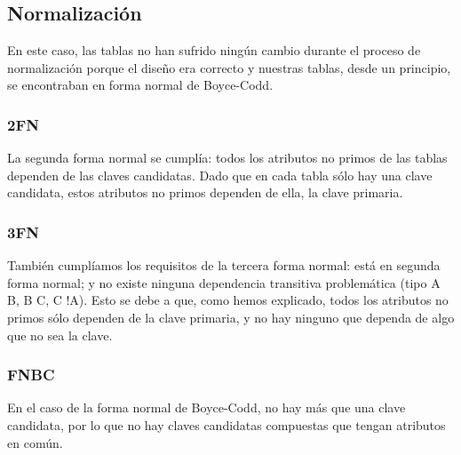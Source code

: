 \subsection{Normalización}
En este caso, las tablas no han sufrido ningún cambio durante el proceso de normalización
porque el diseño era correcto y nuestras tablas, desde un principio, se encontraban en
forma normal de Boyce-Codd.

\subsubsection{2FN}
La segunda forma normal se cumplía: todos los atributos no primos de las tablas dependen de las claves candidatas.
Dado que en cada tabla sólo hay una clave candidata, estos atributos no primos dependen de ella, la clave primaria.


\subsubsection{3FN}
También cumplíamos los requisitos de la tercera forma normal: está en segunda forma normal;
y no existe ninguna dependencia transitiva problemática (tipo A \rightarrow B, B \rightarrow C, C \rightarrow !A). Esto se debe a
que, como hemos explicado, todos los atributos no primos sólo dependen de la clave primaria, y no
hay ninguno que dependa de algo que no sea la clave.


\subsubsection{FNBC}
En el caso de la forma normal de Boyce-Codd, no hay más que una clave candidata, por lo que no
hay claves candidatas compuestas que tengan atributos en común.
